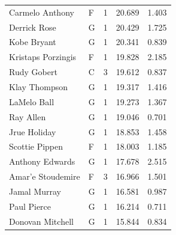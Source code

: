 \begin{table}[t]
\begin{tabular*}{\linewidth}{@{\extracolsep{\fill}}llcrr}
Carmelo Anthony & F & 1 & 20.689 & 1.403 \\ 
Derrick Rose & G & 1 & 20.429 & 1.725 \\ 
Kobe Bryant & G & 1 & 20.341 & 0.839 \\ 
Kristaps Porzingis & F & 1 & 19.828 & 2.185 \\ 
Rudy Gobert & C & 3 & 19.612 & 0.837 \\ 
Klay Thompson & G & 1 & 19.317 & 1.416 \\ 
LaMelo Ball & G & 1 & 19.273 & 1.367 \\ 
Ray Allen & G & 1 & 19.046 & 0.701 \\ 
Jrue Holiday & G & 1 & 18.853 & 1.458 \\ 
Scottie Pippen & F & 1 & 18.003 & 1.185 \\ 
Anthony Edwards & G & 1 & 17.678 & 2.515 \\ 
Amar'e Stoudemire & F & 3 & 16.966 & 1.501 \\ 
Jamal Murray & G & 1 & 16.581 & 0.987 \\ 
Paul Pierce & G & 1 & 16.214 & 0.711 \\ 
Donovan Mitchell & G & 1 & 15.844 & 0.834 \\ 
\bottomrule
\end{tabular*}
\end{table}

